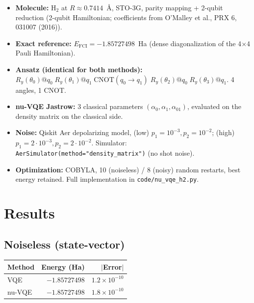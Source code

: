 \documentclass[11pt]{article}
\begin{document}
\begin{itemize}
  \item \textbf{Molecule:} H$_2$ at $R \approx 0.7414$~\AA, STO-3G, parity mapping
    + 2-qubit reduction (2-qubit Hamiltonian; coefficients from O'Malley
    et al., PRX 6, 031007 (2016)).
  \item \textbf{Exact reference:} $E_{\text{FCI}} = -1.85727498$~Ha (dense
    diagonalization of the 4$\times$4 Pauli Hamiltonian).
  \item \textbf{Ansatz (identical for both methods):}
    $R_y(\theta_0)@q_0 \; R_y(\theta_1)@q_1 \; \text{CNOT}(q_0{\to}q_1) \;
    R_y(\theta_2)@q_0 \; R_y(\theta_3)@q_1$. 4 angles, 1 CNOT.
  \item \textbf{nu-VQE Jastrow:} 3 classical parameters
    $(\alpha_0,\alpha_1,\alpha_{01})$, evaluated on the density matrix on the
    classical side.
  \item \textbf{Noise:} Qiskit Aer depolarizing model,
    (low) $p_1=10^{-3}, p_2=10^{-2}$; (high) $p_1=2{\cdot}10^{-3}, p_2=2{\cdot}10^{-2}$.
    Simulator: \texttt{AerSimulator(method="density\_matrix")} (no shot noise).
  \item \textbf{Optimization:} COBYLA, 10 (noiseless) / 8 (noisy) random restarts, best
    energy retained. Full implementation in \texttt{code/nu\_vqe\_h2.py}.
\end{itemize}

\section{Results}

\subsection*{Noiseless (state-vector)}
\begin{center}
\begin{tabular}{lrr}
\toprule
Method & Energy (Ha) & $|$Error$|$ \\
\midrule
VQE     & $-1.85727498$ & $1.2\times10^{-10}$ \\
nu-VQE  & $-1.85727498$ & $1.8\times10^{-10}$ \\
\bottomrule
\end{tabular}
\end{center}
\end{document}
